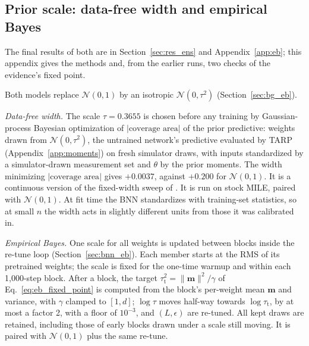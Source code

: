 \documentclass[11pt]{article}
\begin{document}
\subsection{Prior scale: data-free width and empirical Bayes}
\label{sec:res_scale}
\label{app:scale}
The final results of both are in Section~\ref{sec:res_ens} and Appendix~\ref{app:eb}; this appendix gives the
methods and, from the earlier runs, two checks of the evidence's fixed point.

Both models replace $\mathcal{N}(0,1)$ by an isotropic $\mathcal{N}(0,\tau^2)$ (Section~\ref{sec:bg_eb}).

\emph{Data-free width.} The scale $\tau=0.3655$ is chosen before any training by Gaussian-process Bayesian optimization of
$|\text{coverage area}|$ of the prior predictive: weights drawn from $\mathcal{N}(0,\tau^2)$, the untrained network's predictive
evaluated by TARP (Appendix~\ref{app:moments}) on fresh simulator draws, with inputs standardized by a simulator-drawn
measurement set and $\theta$ by the prior moments. The width minimizing $|\text{coverage area}|$ gives $+0.0037$, against $+0.200$ for
$\mathcal{N}(0,1)$. It is a continuous version of the fixed-width sweep of \citet[Fig.~1]{delaunoy2024lowbudget}. It is run on stock MILE,
paired with $\mathcal{N}(0,1)$. At fit time the BNN standardizes with training-set statistics, so at small $n$ the width
acts in slightly different units from those it was calibrated in.

\emph{Empirical Bayes.} One scale for all weights is updated between blocks inside the re-tune loop
(Section~\ref{sec:bnn_eb}). Each member starts at the RMS of its pretrained weights; the scale is fixed for the
one-time warmup and within each 1{,}000-step block. After a block, the target $\tau_{\text{t}}^2=\lVert\mathbf m\rVert^2/\gamma$ of
Eq.~\eqref{eq:eb_fixed_point} is computed from the block's per-weight mean $\mathbf m$ and variance, with $\gamma$ clamped
to $[1,d]$; $\log\tau$ moves half-way towards $\log\tau_{\text{t}}$, by at most a factor 2, with a floor of $10^{-3}$, and
$(L,\epsilon)$ are re-tuned. All kept draws are retained, including those of early blocks drawn under a scale still moving.
It is paired with $\mathcal{N}(0,1)$ plus the same re-tune.
\end{document}
